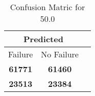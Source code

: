 \begin{table}[] 
\caption{Confusion Matric for 50.0} 
\label{Table: Prediction Accuracy-DMD50.0OnlySunEKF-combinationReflection-Reflection} 
\centering 
\begin{tabular} 
 {@{}ccc@{}} 
\toprule 
\multicolumn{2}{c}{\textbf{Predicted}}
 \\ \midrule 
\multicolumn{1}{|c|}{Failure} & 
\multicolumn{1}{c|}{No Failure}
 \\ \midrule 
\multicolumn{1}{|c|}{\color{green}\textbf{61771}} & 
\multicolumn{1}{c|}{\color{green}\textbf{61460}}
 \\ \midrule 
\multicolumn{1}{|c|}{\color{red}\textbf{23513}} & 
\multicolumn{1}{c|}{\color{red}\textbf{23384}}
 \\ \bottomrule 
\end{tabular} 
\end{table} 

